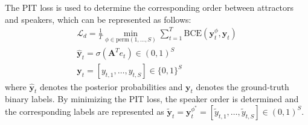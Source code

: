 \documentclass{article}
\begin{document}
The PIT loss is used to determine the corresponding order between attractors and speakers, which can be represented as follows:
\begin{equation}
\begin{gathered}
    \mathcal{L}_{d}=\frac{1}{T} \mathop {\min }\limits_{\phi \in \text{perm} \left(1,\ldots,S \right)} \sum \limits _{t=1}^{T} \text{BCE}\left(\mathbf{y}_{t}^{\phi},\hat{\mathbf{y}}_{t} \right) \\
    \hat{\mathbf{y}}_{t} = \sigma \left ( \mathbf{A}^{T} e_{t} \right) \in {\left( 0, 1 \right)}^{S} \\
    \mathbf{y}_{t} ={ \left[y_{t,1},\ldots,y_{t,S} \right] } \in {\{ 0, 1 \} }^{S}
\end{gathered}
\end{equation}
where $\hat{\mathbf{y}}_{t}$ denotes the posterior probabilities and $\mathbf{y}_{t}$ denotes the ground-truth binary labels. By minimizing the PIT loss, the speaker order is determined and the corresponding labels are represented as $\mathbf{\widetilde{y}}_{t} = \mathbf{y}^{\phi^*}_{t} ={ \left[\widetilde{y}_{t,1},\ldots,\widetilde{y}_{t,S} \right] } \in {\left( 0, 1 \right)}^{S}$.
\end{document}
